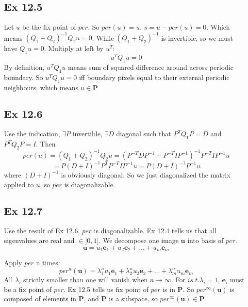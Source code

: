 \documentclass{article}
\begin{document}
	\subsection{Ex 12.5}
	Let $u$ be the fix point of $per$. So $per(u)=u$, $s=u-per(u)=0$. Which means $(Q_1+Q_2)^{-1}Q_1u=0$. While $(Q_1+Q_2)^{-1}$ is invertible, so we must have $Q_1u=0$. Multiply at left by $u^T$:
	$$
	u^T Q_1 u = 0
	$$
	By definition, $u^T Q_1 u$ means sum of squared difference around across periodic boundary. So $u^T Q_1 u=0$ iff boundary pixels equal to their external periodic neighbours, which means $u\in\mathbf{P}$
	
	\subsection{Ex 12.6}
	Use the indication, $\exists P$ invertible, $\exists D$ diagonal such that $P^T Q_1 P = D$ and $P^T Q_2 P = I$. Then
	$$
	per(u) = (Q_1+Q_2)^{-1}Q_2u = (P^{-T}DP^{-1}+P^{-T}IP^{-1})^{-1} P^{-T} I P^{-1} u
	$$
	$$
	= P (D+I)^{-1} P^T P^{-T} I P^{-1} u = P (D+I)^{-1} P^{-1} u
	$$
	where $(D+I)^{-1}$ is obviously diagonal. So we just diagonalized the matrix applied to $u$, so $per$ is diagonalizable.
	\subsection{Ex 12.7}
	Use the result of Ex 12.6. $per$ is diagonalizable. Ex 12.4 tells us that all eigenvalues are real and $\in ]0,1]$. We decompose one image $\mathbf{u}$ into basis of $per$.
	$$
	\mathbf{u} = u_1 \mathbf{e}_1 +u_2 \mathbf{e}_2+\dots+u_m \mathbf{e}_m
	$$
	
	Apply $per$ n times:
	$$
	per^n(\mathbf{u}) = \lambda_1^n u_1 \mathbf{e}_1 + \lambda_2^n u_2 \mathbf{e}_2+\dots+ \lambda_m^n u_m \mathbf{e}_m
	$$
	All $\lambda_i$ strictly smaller than one will vanish when $n \rightarrow \infty$. For $i s.t. \lambda_i = 1$, $\mathbf{e}_i$ must be a fix point of $per$. Ex 12.5 tells us fix point of $per$ is in $\mathbf{P}$. So $per^\infty(\mathbf{u})$ is composed of elements in $\mathbf{P}$, and $\mathbf{P}$ is a subspace, so $per^\infty(\mathbf{u}) \in \mathbf{P} $
\end{document}
